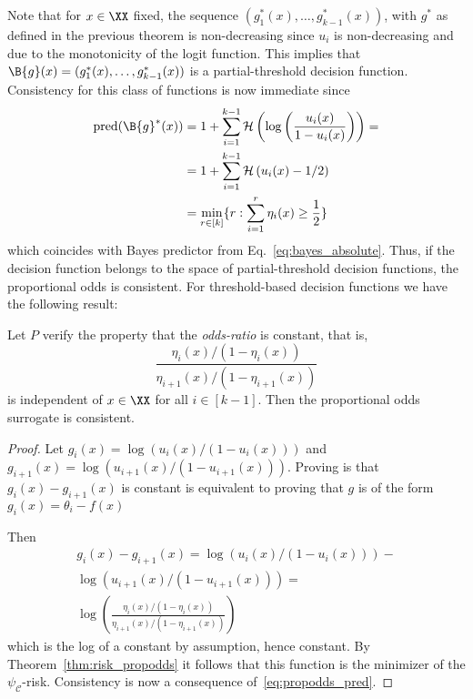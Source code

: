 Note that for $x \in \XX$ fixed, the sequence $(g^*_1(x), \ldots, g^*_{k-1}(x))$, with $g^*$ as defined in the previous theorem is non-decreasing since $u_i$ is non-decreasing and due to the monotonicity of the logit function. This implies that $\B{g}(x) = (g^*_1(x), \ldots, g^*_{k-1}(x))$ is a partial-threshold decision function. Consistency for this class of functions is now immediate since
\begin{equation}
\begin{aligned}
\mathrm{pred}(\B{g}^*(x)) &= 1 + \sum_{i=1}^{k-1}\mathcal{H}\left(\log\left(\frac{u_i(x)}{1 - u_i(x)}\right)\right) = \\
& = 1 + \sum_{i=1}^{k-1}\mathcal{H}\left(u_i(x) - 1/2\right) \\
& = \min_{r \in [k]} \{r : \sum_{i=1}^r \eta_i(x) \geq \frac{1}{2}\}
\end{aligned}
\label{eq:propodds_pred}
\end{equation}
which coincides with Bayes predictor from Eq.~\eqref{eq:bayes_absolute}. Thus, if the decision function belongs to the space of partial-threshold decision functions, the proportional odds is consistent. For threshold-based decision functions we have the following result:


\begin{corollary} \label{cor:prop_odds}
Let $P$ verify the property that the \emph{odds-ratio} is constant, that is,
\begin{equation}\label{eq:odds_ratio}
\frac{\eta_i(x) / (1 - \eta_i(x))}{\eta_{i+1}(x) / (1 - \eta_{i+1}(x))}
\end{equation}
is independent of $x \in \XX$ for all $i \in [k-1]$. Then the proportional odds surrogate is consistent.
\end{corollary}

\begin{proof} 
Let $g_i(x) = \log\left({u_i(x)}/(1 - u_i(x))\right)$ and $g_{i+1}(x) = \log\left({u_{i+1}(x)}/(1 - u_{i+1}(x))\right)$. Proving is that $g_i(x) - g_{i+1}(x)$ is constant is equivalent to proving that $g$ is of the form $g_i(x) = \theta_i - f(x)$

Then
$$
\begin{aligned}
g_i(x) - g_{i+1}(x) = \log\left({u_i(x)}/(1 - u_i(x))\right) - \\ 
\log\left({u_{i+1}(x)}/(1 - u_{i+1}(x))\right) = \\
\log\left(\frac{\eta_i(x) / (1 - \eta_i(x))}{\eta_{i+1}(x) / (1 - \eta_{i+1}(x))}\right)
\end{aligned}
$$ 
which is the log of a constant by assumption, hence constant. By Theorem~\ref{thm:risk_propodds} it follows that this function is the minimizer of the $\psi_{\mathcal{C}}$-risk. Consistency is now a consequence of~\eqref{eq:propodds_pred}.
\end{proof}

